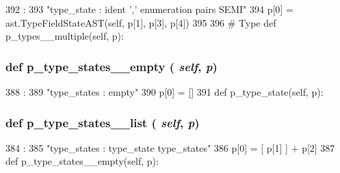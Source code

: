 \begin{DoxyVerb}
\begin{DoxyCode}
392                              :
393         "type_state : ident ',' enumeration pairs SEMI"
394         p[0] = ast.TypeFieldStateAST(self, p[1], p[3], p[4])
395 
396     # Type
    def p_types__multiple(self, p):
\end{DoxyCode}
\hypertarget{classslicc_1_1parser_1_1SLICC_ad837bb9d3ebd0117fdc55a97533bb325}{
\subsubsection[{p\_\-type\_\-states\_\-\_\-empty}]{\setlength{\rightskip}{0pt plus 5cm}def p\_\-type\_\-states\_\-\_\-empty ( {\em self}, \/   {\em p})}}
\label{classslicc_1_1parser_1_1SLICC_ad837bb9d3ebd0117fdc55a97533bb325}



\begin{DoxyCode}
388                                      :
389         "type_states : empty"
390         p[0] = []
391 
    def p_type_state(self, p):
\end{DoxyCode}
\hypertarget{classslicc_1_1parser_1_1SLICC_a69cd318d196bc2284d15defde25688ba}{
\subsubsection[{p\_\-type\_\-states\_\-\_\-list}]{\setlength{\rightskip}{0pt plus 5cm}def p\_\-type\_\-states\_\-\_\-list ( {\em self}, \/   {\em p})}}
\label{classslicc_1_1parser_1_1SLICC_a69cd318d196bc2284d15defde25688ba}



\begin{DoxyCode}
384                                     :
385         "type_states : type_state type_states"
386         p[0] = [ p[1] ] + p[2]
387 
    def p_type_states__empty(self, p):
\end{DoxyCode}
\hypertarget{classslicc_1_1parser_1_1SLICC_aa1ad43d69028fac967854e05a8512a59}{
}
\end{DoxyVerb}
